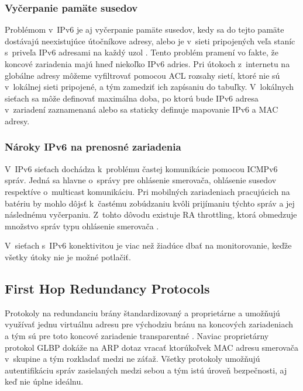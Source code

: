 \subsubsection*{Vyčerpanie pamäte susedov}
Problémom v~IPv6 je aj vyčerpanie pamäte susedov, kedy sa do tejto pamäte dostávajú neexistujúce útočníkove adresy, alebo je v~sieti pripojených veľa staníc s~priveľa IPv6 adresami na každý uzol \cite{Podermanski1232015} \cite{Podermanski1932015}. Tento problém pramení vo fakte, že koncové zariadenia majú hneď niekoľko IPv6 adries. Pri útokoch z~internetu na globálne adresy môžeme vyfiltrovať pomocou ACL rozsahy sietí, ktoré nie sú v~lokálnej sieti pripojené, a tým zamedziť ich zapísaniu do tabuľky. V~lokálnych sieťach sa môže definovať maximálna doba, po ktorú bude IPv6 adresa v~zariadení zaznamenaná alebo sa staticky definuje mapovanie IPv6 a MAC adresy. 

\subsubsection*{Nároky IPv6 na prenosné zariadenia}
V~IPv6 sieťach dochádza k~problému častej komunikácie pomocou ICMPv6 správ. Jedná sa hlavne o~správy pre ohlásenie smerovača, ohlásenie susedov respektíve o~multicast komunikáciu. Pri mobilných zariadeniach pracujúcich na batériu by mohlo dôjsť k~častému zobúdzaniu kvôli prijímaniu týchto správ a jej následnému vyčerpaniu. Z~tohto dôvodu existuje RA throttling, ktorá obmedzuje množstvo správ typu ohlásenie smerovača \cite{Podermanski532015}.


V~sieťach s~IPv6 konektivitou je viac než žiadúce dbať na monitorovanie, keďže všetky útoky nie je možné potlačiť. 



\subsection*{First Hop Redundancy Protocols}
Protokoly na redundanciu brány štandardizovaný  a proprietárne  a  umožňujú využívať jednu virtuálnu adresu pre východziu bránu na koncových zariadeniach a tým sú pre toto koncové zariadenie transparentné \cite{Lammle2013}. Naviac proprietárny protokol GLBP dokáže na ARP dotaz vracať ktorúkoľvek MAC adresu smerovača v~skupine a tým rozkladať medzi ne záťaž. Všetky protokoly umožňujú autentifikáciu správ zasielaných medzi sebou a tým istú úroveň bezpečnosti, aj keď nie úplne ideálnu.  

